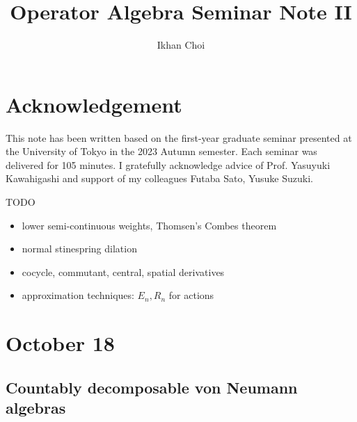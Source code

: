 \documentclass{../../small}
\begin{document}
\title{Operator Algebra Seminar Note II}
\author{Ikhan Choi}
\maketitle
\tableofcontents


\section*{Acknowledgement}
This note has been written based on the first-year graduate seminar presented at the University of Tokyo in the 2023 Autumn semester.
Each seminar was delivered for 105 minutes.
I gratefully acknowledge advice of Prof. Yasuyuki Kawahigashi and support of my colleagues Futaba Sato, Yusuke Suzuki.

TODO
\begin{itemize}
\item lower semi-continuous weights, Thomsen's Combes theorem
\item normal stinespring dilation
\item cocycle, commutant, central, spatial derivatives
\item approximation techniques: $E_n,R_n$ for actions
\end{itemize}


\newpage
\section{October 18}

\subsection{Countably decomposable von Neumann algebras}
\end{document}
